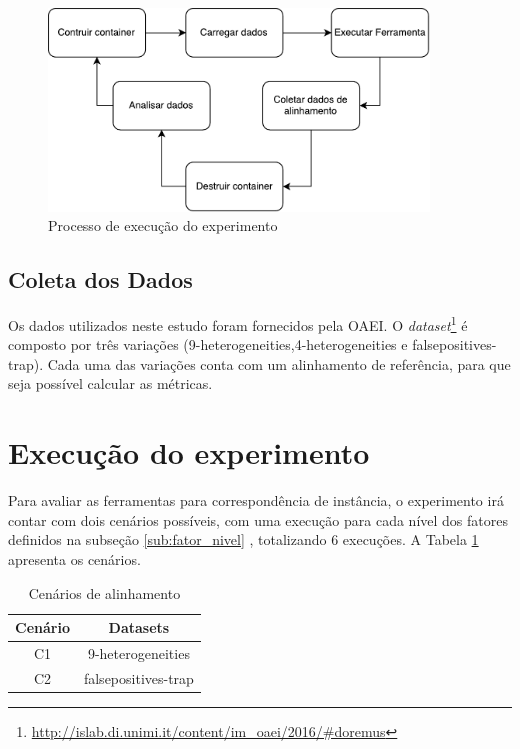 \begin{figure}[h]
	\centering
	\includegraphics[width=0.9\textwidth]{./imagens/experimento.pdf}
	\caption{Processo de execução do experimento}
	\label{fig:experiment}
\end{figure}

\subsection{Coleta dos Dados}
Os dados utilizados neste estudo foram fornecidos pela OAEI. O \textit{dataset}\footnote{\url{http://islab.di.unimi.it/content/im_oaei/2016/\#doremus}} é composto por três variações (9-heterogeneities,4-heterogeneities e falsepositives-trap). Cada uma das variações conta com um alinhamento de referência, para que seja possível calcular as métricas.

\section{Execução do experimento}
Para avaliar as ferramentas para correspondência de instância, o experimento irá contar com dois cenários possíveis, com uma execução para cada nível dos fatores definidos na subseção \ref{sub:fator_nivel} , totalizando 6 execuções. A Tabela \ref{tab:cenarios} apresenta os cenários. 

\begin{table}[h]
	\centering
	\caption{Cenários de alinhamento}
	\label{tab:cenarios}
	\begin{tabular}{|c|c|}
		\hline
		\textbf{Cenário} & \textbf{Datasets}          \\ \hline
		C1               & 9-heterogeneities          \\ \hline
		C2               & falsepositives-trap        \\ \hline
	\end{tabular}
\end{table}

